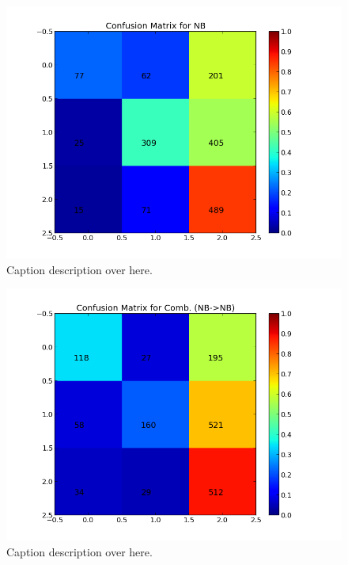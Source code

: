 \begin{minipage}[s]{\linewidth}
     \begin{minipage}{0.45\linewidth}
          \begin{figure}[H]
               \includegraphics[width=\linewidth]{../img/plots/grid/confusion_matrix_NB.png}
           \caption[Results overview across models]{Caption description over here.}
           \label{fig:confmat_nb}
          \end{figure}
     \end{minipage}
     \hspace{0.05\linewidth}
     \begin{minipage}{0.45\linewidth}
          \begin{figure}[H]
               \includegraphics[width=\linewidth]{../img/plots/grid/confusion_matrix_Comb-NB-NB.png}
           \caption[Results overview across models]{Caption description over here.}
           \label{fig:confmat_nb_nb}
          \end{figure}
     \end{minipage}   \\
         


\end{minipage}
